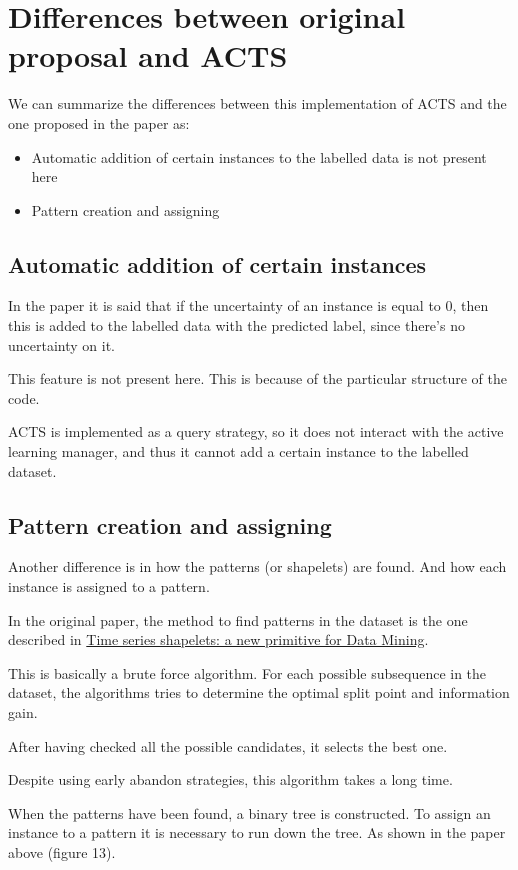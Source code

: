 \section{Differences between original proposal and ACTS}
We can summarize the differences between this implementation of ACTS and 
the one proposed in the paper as:
\begin{itemize}
    \item Automatic addition of certain instances to the labelled data is not
    present here
    \item Pattern creation and assigning
\end{itemize}

\subsection{Automatic addition of certain instances}
In the paper it is said that if the uncertainty of an instance is equal to 0, then 
this is added to the labelled data with the predicted label, since there's no uncertainty
on it.

This feature is not present here. This is because of the particular structure of the code.

ACTS is implemented as a query strategy, so it does not interact with the active learning
manager, and thus it cannot add a certain instance to the labelled dataset.

\subsection{Pattern creation and assigning}
Another difference is in how the patterns (or shapelets) are found. And how each instance 
is assigned to a pattern.

In the original paper, the method to find patterns in the dataset is the one described in 
\href{https://dl.acm.org/doi/10.1007/s10618-010-0179-5}{Time series shapelets: a new primitive
for Data Mining}. 

This is basically a brute force algorithm. For each possible subsequence in the dataset, 
the algorithms tries to determine the optimal split point and information gain.

After having checked all the possible candidates, it selects the best one.

Despite using early abandon strategies, this algorithm takes a long time.

When the patterns have been found, a binary tree is constructed. To assign an instance to a 
pattern it is necessary to run down the tree. As shown in the paper above (figure 13).

